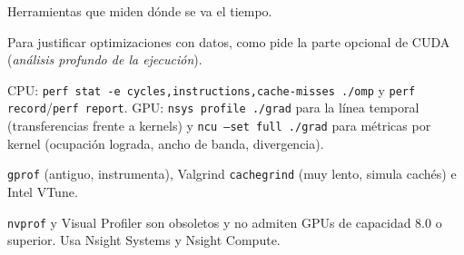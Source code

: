 \que Herramientas que miden dónde se va el tiempo.

\porque Para justificar optimizaciones con datos, como pide la parte opcional de CUDA (\emph{análisis profundo de la ejecución}).

\como CPU: \texttt{perf stat -e cycles,instructions,cache-misses ./omp} y \texttt{perf record}/\texttt{perf report}. GPU: \texttt{nsys profile ./grad} para la línea temporal (transferencias frente a kernels) y \texttt{ncu --set full ./grad} para métricas por kernel (ocupación lograda, ancho de banda, divergencia).

\alt \texttt{gprof} (antiguo, instrumenta), Valgrind \texttt{cachegrind} (muy lento, simula cachés) e Intel VTune.

\begin{trampa}
\texttt{nvprof} y Visual Profiler son obsoletos y no admiten GPUs de capacidad 8.0 o superior. Usa Nsight Systems y Nsight Compute.
\end{trampa}
\clearpage
